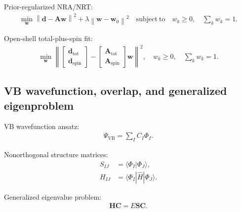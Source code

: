\documentclass[11pt]{article}
\newcommand{\vb}{\mathrm{VB}}
\newcommand{\overlap}{\mathbf{S}}
\newcommand{\ham}{\mathbf{H}}
\begin{document}
Prior-regularized NRA/NRT:
\begin{equation}
\begin{aligned}
	\min_{\mathbf{w}} \left\| \mathbf{d} - \mathbf{A}\mathbf{w} \right\|^2
	+ \lambda \left\| \mathbf{w} - \mathbf{w}_0 \right\|^2
	\quad \mathrm{subject\ to} \quad
	w_k \ge 0,\quad \sum_k w_k = 1.
\end{aligned}
\end{equation}

Open-shell total-plus-spin fit:
\begin{equation}
\begin{aligned}
	\min_{\mathbf{w}}
	\left\|
	\begin{bmatrix}
	\mathbf{d}_{\mathrm{tot}} \\
	\mathbf{d}_{\mathrm{spin}}
	\end{bmatrix}
	-
	\begin{bmatrix}
	\mathbf{A}_{\mathrm{tot}} \\
	\mathbf{A}_{\mathrm{spin}}
	\end{bmatrix}
	\mathbf{w}
	\right\|^2,
	\quad w_k \ge 0,\quad \sum_k w_k = 1.
\end{aligned}
\end{equation}

\subsection{VB wavefunction, overlap, and generalized eigenproblem}
VB wavefunction ansatz:
\begin{equation}
\begin{aligned}
	\Psi_{\vb} = \sum_I C_I \Phi_I.
\end{aligned}
\end{equation}

Nonorthogonal structure matrices:
\begin{equation}
\begin{aligned}
	S_{IJ} &= \langle \Phi_I | \Phi_J \rangle, \\
	H_{IJ} &= \langle \Phi_I | \hat{H} | \Phi_J \rangle.
\end{aligned}
\end{equation}

Generalized eigenvalue problem:
\begin{equation}
\begin{aligned}
	\ham \mathbf{C} = E \overlap \mathbf{C}.
\end{aligned}
\end{equation}
\end{document}
